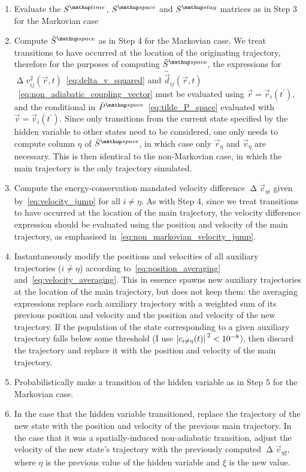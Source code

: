 \begin{enumerate}
    \item Evaluate the $S^\up{time}$, $S^\up{space}$ and $S^\up{stay}$ matrices as in Step 3 for the Markovian case 

    \item Compute $\tilde S^\up{space}$ as in Step 4 for the Markovian case. We treat transitions to have occurred at the location of the originating trajectory, therefore for the purposes of computing $\tilde S^\up{space}$, the expressions for $\upDelta v^2_{ij}(\vec r, t)$~\eqref{eq:delta_v_squared} and $\hat{\vec d}_{ij}(\vec r, t)$~\eqref{eq:non_adiabatic_coupling_vector} must be evaluated using $\vec r = \vec r_i(t^\prime)$, and the conditional in $\tilde P^\up{space}$~\eqref{eq:tilde_P_space} evaluated with $\vec v = \vec v_i(t^\prime)$. Since only transitions from the current state specified by the hidden variable to other states need to be considered, one only needs to compute column $\eta$ of $\tilde S^\up{space}$, in which case only $\vec r_\eta$ and $\vec v_\eta$ are necessary. This is then identical to the non-Markovian case, in which the main trajectory is the only trajectory simulated.

    \item Compute the energy-conservation mandated velocity difference $\upDelta\vec v_{\eta i}$ given by~\eqref{eq:velocity_jump} for all $i\neq\eta$. As with Step 4, since we treat transitions to have occurred at the location of the main trajectory, the velocity difference expression should be evaluated using the position and velocity of the main trajectory, as emphasised in~\eqref{eq:non_markovian_velocity_jump}. 

    \item Instantaneously modify the positions and velocities of all auxiliary trajectories ($i\neq\eta$) according to~\eqref{eq:position_averaging} and~\eqref{eq:velocity_averaging}. This in essence spawns new auxiliary trajectories at the location of the main trajectory, but does not keep them: the averaging expressions replace each auxiliary trajectory with a weighted sum of its previous position and velocity and the position and velocity of the new trajectory. If the population of the state corresponding to a given auxiliary trajectory falls below some threshold (I use $\abs{c_{i\neq\eta}(t)}^2 < 10^{-8}$), then discard the trajectory and replace it with the position and velocity of the main trajectory.

    \item Probabilistically make a transition of the hidden variable as in Step 5 for the Markovian case.
    
    \item In the case that the hidden variable transitioned, replace the trajectory of the new state with the position and velocity of the previous main trajectory.
    In the case that it was a spatially-induced non-adiabatic transition, adjust the velocity of the new state's trajectory with the previously computed $\upDelta\vec v_{\eta\xi}$, where $\eta$ is the previous value of the hidden variable and $\xi$ is the new value.
   
\end{enumerate}

